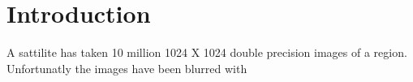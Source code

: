 \section{Introduction}

A sattilite has taken 10 million 1024 X 1024 double precision images of a region. Unfortunatly the images have been blurred with  
